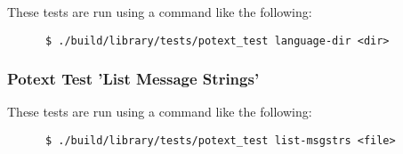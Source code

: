    These tests are run using a command like the following:

   \begin{verbatim}
      $ ./build/library/tests/potext_test language-dir <dir>
   \end{verbatim}

\subsubsection{Potext Test 'List Message Strings'}
\label{subsubsec:potext_test_list_message_strings}

   These tests are run using a command like the following:

   \begin{verbatim}
      $ ./build/library/tests/potext_test list-msgstrs <file>
   \end{verbatim}

